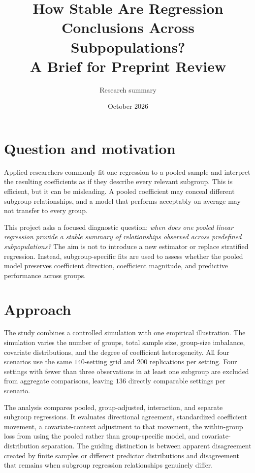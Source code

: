 \documentclass[10pt]{article}
\title{\textbf{How Stable Are Regression Conclusions Across Subpopulations?}\\
\large A Brief for Preprint Review}
\author{Research summary}
\date{October 2026}
\begin{document}
\maketitle

\section*{Question and motivation}

Applied researchers commonly fit one regression to a pooled sample and interpret the resulting coefficients as if they describe every relevant subgroup. This is efficient, but it can be misleading. A pooled coefficient may conceal different subgroup relationships, and a model that performs acceptably on average may not transfer to every group.

This project asks a focused diagnostic question: \emph{when does one pooled linear regression provide a stable summary of relationships observed across predefined subpopulations?} The aim is not to introduce a new estimator or replace stratified regression. Instead, subgroup-specific fits are used to assess whether the pooled model preserves coefficient direction, coefficient magnitude, and predictive performance across groups.

\section*{Approach}

The study combines a controlled simulation with one empirical illustration. The simulation varies the number of groups, total sample size, group-size imbalance, covariate distributions, and the degree of coefficient heterogeneity. All four scenarios use the same $140$-setting grid and $200$ replications per setting. Four settings with fewer than three observations in at least one subgroup are excluded from aggregate comparisons, leaving $136$ directly comparable settings per scenario.

The analysis compares pooled, group-adjusted, interaction, and separate subgroup regressions. It evaluates directional agreement, standardized coefficient movement, a covariate-context adjustment to that movement, the within-group loss from using the pooled rather than group-specific model, and covariate-distribution separation. The guiding distinction is between apparent disagreement created by finite samples or different predictor distributions and disagreement that remains when subgroup regression relationships genuinely differ.
\end{document}
